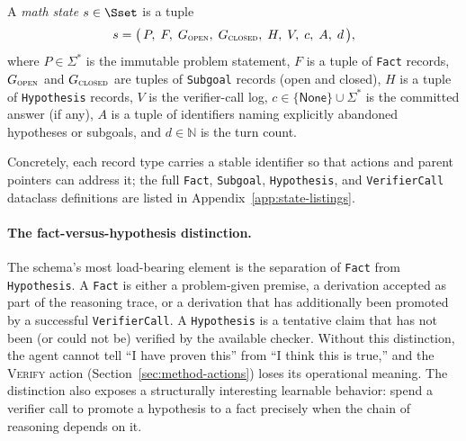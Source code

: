 \begin{definition}
\label{def:mathstate}
A \emph{math state} $s \in \Sset$ is a tuple
\[
  s = \bigl(\,P,\; F,\; G_{\textsc{open}},\; G_{\textsc{closed}},\;
            H,\; V,\; c,\; A,\; d\,\bigr),
\]
where $P \in \Sigma^{*}$ is the immutable problem statement, $F$ is a tuple
of \texttt{Fact} records, $G_{\textsc{open}}$ and $G_{\textsc{closed}}$ are
tuples of \texttt{Subgoal} records (open and closed), $H$ is a tuple of
\texttt{Hypothesis} records, $V$ is the verifier-call log, $c \in
\{\textsf{None}\} \cup \Sigma^{*}$ is the committed answer (if any), $A$ is
a tuple of identifiers naming explicitly abandoned hypotheses or subgoals,
and $d \in \mathbb{N}$ is the turn count.
\end{definition}

Concretely, each record type carries a stable identifier so that actions and
parent pointers can address it; the full \texttt{Fact}, \texttt{Subgoal},
\texttt{Hypothesis}, and \texttt{VerifierCall} dataclass definitions are
listed in Appendix~\ref{app:state-listings}.

\paragraph{The fact-versus-hypothesis distinction.}
The schema's most load-bearing element is the separation of \texttt{Fact}
from \texttt{Hypothesis}. A \texttt{Fact} is either a problem-given premise,
a derivation accepted as part of the reasoning trace, or a derivation that
has additionally been promoted by a successful \texttt{VerifierCall}. A
\texttt{Hypothesis} is a tentative claim that has not been (or could not be)
verified by the available checker. Without this distinction, the agent
cannot tell ``I have proven this'' from ``I think this is true,'' and the
\textsc{Verify} action (Section~\ref{sec:method-actions}) loses its
operational meaning. The distinction also exposes a structurally
interesting learnable behavior: spend a verifier call to promote a
hypothesis to a fact precisely when the chain of reasoning depends on it.


